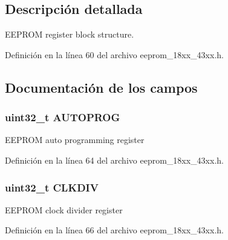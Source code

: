 \subsection{Descripción detallada}
E\+E\+P\+R\+OM register block structure. 

Definición en la línea 60 del archivo eeprom\+\_\+18xx\+\_\+43xx.\+h.



\subsection{Documentación de los campos}
\subsubsection[{\texorpdfstring{A\+U\+T\+O\+P\+R\+OG}{AUTOPROG}}]{ uint32\+\_\+t A\+U\+T\+O\+P\+R\+OG}\hypertarget{struct_l_p_c___e_e_p_r_o_m___t_a13534dce16423215a9bc99e327e472d8}{}\label{struct_l_p_c___e_e_p_r_o_m___t_a13534dce16423215a9bc99e327e472d8}
E\+E\+P\+R\+OM auto programming register 

Definición en la línea 64 del archivo eeprom\+\_\+18xx\+\_\+43xx.\+h.

\subsubsection[{\texorpdfstring{C\+L\+K\+D\+IV}{CLKDIV}}]{ uint32\+\_\+t C\+L\+K\+D\+IV}\hypertarget{struct_l_p_c___e_e_p_r_o_m___t_a2a33dba1349d1ebe45133cb2789a5307}{}\label{struct_l_p_c___e_e_p_r_o_m___t_a2a33dba1349d1ebe45133cb2789a5307}
E\+E\+P\+R\+OM clock divider register 

Definición en la línea 66 del archivo eeprom\+\_\+18xx\+\_\+43xx.\+h.

